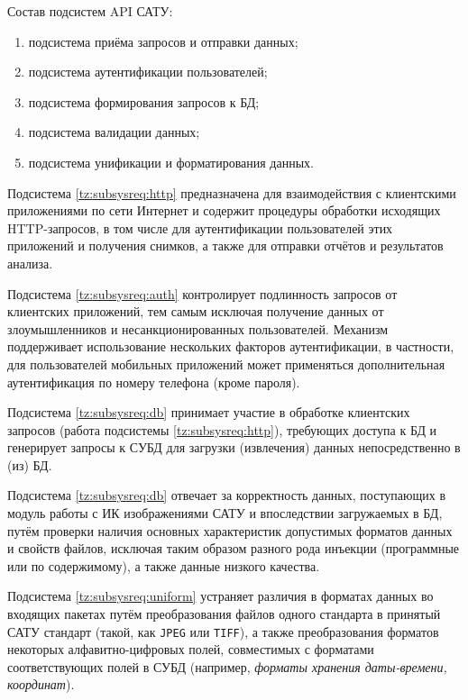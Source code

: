\par

	Состав подсистем API САТУ:

	\begin{enumerate}
		\item подсистема приёма запросов и отправки данных; \label{tz:subsysreq:http}
		\item подсистема аутентификации пользователей; \label{tz:subsysreq:auth}
		\item подсистема формирования запросов к БД; \label{tz:subsysreq:db}
		\item подсистема валидации данных; \label{tz:subsysreq:validate}
		\item подсистема унификации и форматирования данных. \label{tz:subsysreq:uniform}
	\end{enumerate}

	Подсистема \ref{tz:subsysreq:http} предназначена для взаимодействия с клиентскими приложениями по сети Интернет и содержит процедуры обработки исходящих HTTP-запросов, в том числе для аутентификации пользователей этих приложений и получения снимков, а также для отправки отчётов и результатов анализа.

	Подсистема \ref{tz:subsysreq:auth} контролирует подлинность запросов от клиентских приложений, тем самым исключая получение данных от злоумышленников и несанкционированных пользователей. Механизм поддерживает использование нескольких факторов аутентификации, в частности, для пользователей мобильных приложений может применяться дополнительная аутентификация по номеру телефона (кроме пароля).

	Подсистема \ref{tz:subsysreq:db} принимает участие в обработке клиентских запросов (работа подсистемы \ref{tz:subsysreq:http}), требующих доступа к БД и генерирует запросы к СУБД для загрузки (извлечения) данных непосредственно в (из) БД.

	Подсистема \ref{tz:subsysreq:db} отвечает за корректность данных, поступающих в модуль работы с ИК изображениями САТУ и впоследствии загружаемых в БД, путём проверки наличия основных характеристик допустимых форматов данных и свойств файлов, исключая таким образом разного рода инъекции (программные или по содержимому), а также данные низкого качества.

	Подсистема \ref{tz:subsysreq:uniform} устраняет различия в форматах данных во входящих пакетах путём преобразования файлов одного стандарта в принятый САТУ стандарт (такой, как \texttt{JPEG} или \texttt{TIFF}), а также преобразования форматов некоторых алфавитно-цифровых полей, совместимых с форматами соответствующих полей в СУБД (например, \textit{форматы хранения даты-времени, координат}).

